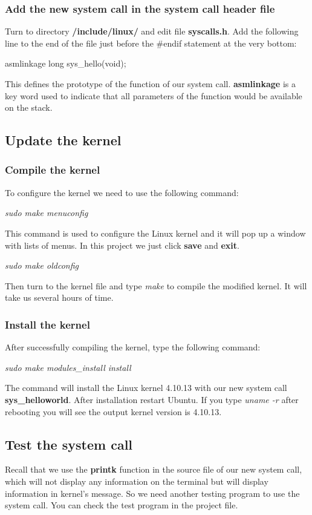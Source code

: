 \documentclass[12pt]{article}
\begin{document}
\subsubsection{Add the new system call in the system call header file}
Turn to directory \textbf{/include/linux/} and edit file \textbf{syscalls.h}. Add the following line to the end of the file just before the \#endif  statement at the very bottom:
\begin{center}
	asmlinkage long sys\_hello(void);
\end{center}
This defines the prototype of the function of our system call. \textbf{asmlinkage} is a key word used to indicate that all parameters of the function would be available on the stack.

\subsection{Update the kernel}
\subsubsection{Compile the kernel}
To configure the kernel we need to use the following command:
\begin{center}
	\emph{sudo make menuconfig}
\end{center}
This command is used to configure the Linux kernel and it will pop up a window with lists of menus. In this project we just click \textbf{save} and \textbf{exit}.
\begin{center}
	\emph{sudo make oldconfig}
\end{center}
Then turn to the kernel file and type \emph{make} to compile the modified kernel. It will take us several hours of time.

\subsubsection{Install the kernel}
After successfully compiling the kernel, type the following command:
\begin{center}
	\emph{sudo make modules\_install install}
\end{center}
The command will install the Linux kernel 4.10.13 with our new system call\\ \textbf{sys\_helloworld}. After installation restart Ubuntu. If you type \emph{uname -r} after rebooting you will see the output kernel version is 4.10.13.

\subsection{Test the system call}
Recall that we use the \textbf{printk} function in the source file of our new system call, which will not display any information on the terminal but will display information in kernel's message. So we need another testing program to use the system call. You can check the test program in the project file.
\end{document}
